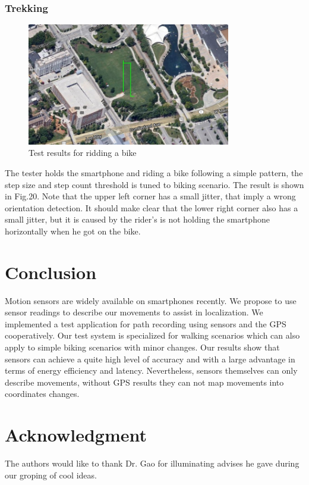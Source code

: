 \documentclass[journal]{IEEEtran}
\begin{document}
\subsubsection{Trekking}
\begin{figure}
	\centering
	\includegraphics[width=3.5in]{figures/4-biking}
	\caption{Test results for ridding a bike}
\end{figure}

The tester holds the smartphone and riding a bike following a simple pattern, the step size and step count threshold is tuned to biking scenario.
The result is shown in Fig.20.
Note that the upper left corner has a small jitter, that imply a wrong orientation detection.
It should make clear that the lower right corner also has a small jitter, but it is caused by the rider's is not holding the smartphone horizontally when he got on the bike.

\section{Conclusion}
Motion sensors are widely available on smartphones recently.
We propose to use sensor readings to describe our movements to assist in localization.
We implemented a test application for path recording using sensors and the GPS cooperatively.
Our test system is specialized for walking scenarios which can also apply to simple biking scenarios with minor changes.
Our results show that sensors can achieve a quite high level of accuracy and with a large advantage in terms of energy efficiency and latency.
Nevertheless, sensors themselves can only describe movements, without GPS results they can not map movements into coordinates changes.

\section*{Acknowledgment}
The authors would like to thank Dr. Gao for illuminating advises he gave during our groping of cool ideas.
\end{document}
